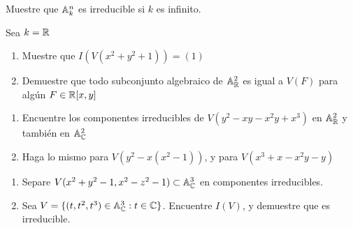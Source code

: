 \begin{sol}{1.25}

\end{sol}

\begin{prob}{1.29}
    Muestre que \(\mathbb{A}_k^n\) es irreducible si $k$ es infinito.
\end{prob}

\begin{sol}{1.29}

\end{sol}

\begin{prob}{1.30}
    Sea \(k=\mathbb{R}\)
    \begin{enumerate}[label= (\alph*)]
        \item Muestre que \(I(V(x^2+y^2+1))=(1)\)
        \item Demuestre que todo subconjunto algebraico de \(\mathbb{A}_{\mathbb{R}}^2\) es igual a \(V(F)\) para algún \(F\in\mathbb{R}[x,y]\)
    \end{enumerate}
\end{prob}

\begin{sol}{1.30}

\end{sol}

\begin{prob}{1.31}
    \begin{enumerate}[label= (\alph*)]
        \item Encuentre los componentes irreducibles de \(V(y^2-xy-x^2y+x^3)\) en \(\mathbb{A}_{\mathbb{R}}^2\) y también en \(\mathbb{A}_{\mathbb{C}}^2\)
        \item Haga lo mismo para \(V(y^2-x(x^2-1))\), y para \(V(x^3+x-x^2y-y)\)
    \end{enumerate}
\end{prob}

\begin{sol}{1.31}

\end{sol}

\begin{prob}{1.33}
    \begin{enumerate}[label= (\alph*)]
        \item Separe \(V(x^2+y^2-1,x^2-z^2-1)\subset\mathbb{A}_{\mathbb{C}}^3\) en componentes irreducibles.
        \item Sea \(V=\{(t,t^2,t^3)\in\mathbb{A}_{\mathbb{C}}^3:t\in\mathbb{C}\}\). Encuentre \(I(V)\), y demuestre que es irreducible.
    \end{enumerate}
\end{prob}

